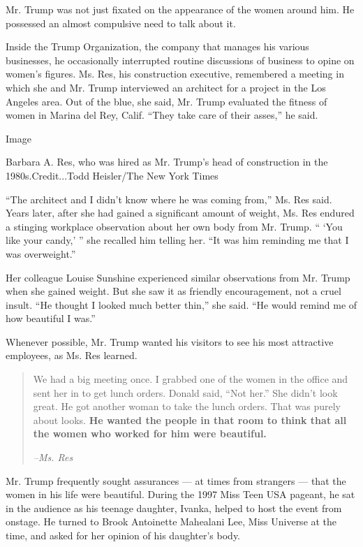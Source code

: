 Mr. Trump was not just fixated on the appearance of the women around
him. He possessed an almost compulsive need to talk about it.

Inside the Trump Organization, the company that manages his various
businesses, he occasionally interrupted routine discussions of business
to opine on women's figures. Ms. Res, his construction executive,
remembered a meeting in which she and Mr. Trump interviewed an architect
for a project in the Los Angeles area. Out of the blue, she said, Mr.
Trump evaluated the fitness of women in Marina del Rey, Calif. ``They
take care of their asses,'' he said.

Image

Barbara A. Res, who was hired as Mr. Trump's head of construction in the
1980s.Credit...Todd Heisler/The New York Times

``The architect and I didn't know where he was coming from,'' Ms. Res
said. Years later, after she had gained a significant amount of weight,
Ms. Res endured a stinging workplace observation about her own body from
Mr. Trump. `` `You like your candy,' '' she recalled him telling her.
``It was him reminding me that I was overweight.''

Her colleague Louise Sunshine experienced similar observations from Mr.
Trump when she gained weight. But she saw it as friendly encouragement,
not a cruel insult. ``He thought I looked much better thin,'' she said.
``He would remind me of how beautiful I was.''

Whenever possible, Mr. Trump wanted his visitors to see his most
attractive employees, as Ms. Res learned.

\begin{quote}
We had a big meeting once. I grabbed one of the women in the office and
sent her in to get lunch orders. Donald said, ``Not her.'' She didn't
look great. He got another woman to take the lunch orders. That was
purely about looks. \textbf{He wanted the people in that room to think
that all the women who worked for him were beautiful.}

\emph{--Ms. Res}
\end{quote}

Mr. Trump frequently sought assurances --- at times from strangers ---
that the women in his life were beautiful. During the 1997 Miss Teen USA
pageant, he sat in the audience as his teenage daughter, Ivanka, helped
to host the event from onstage. He turned to Brook Antoinette Mahealani
Lee, Miss Universe at the time, and asked for her opinion of his
daughter's body.

